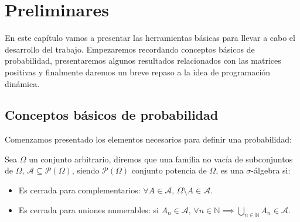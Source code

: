 \chapter{Preliminares}

En este capítulo vamos a presentar las herramientas básicas para llevar a cabo el desarrollo del trabajo. Empezaremos recordando conceptos básicos de probabilidad, presentaremos algunos resultados relacionados con las matrices positivas y finalmente daremos un breve repaso a la idea de programación dinámica.

\section{Conceptos básicos de probabilidad}
Comenzamos presentado los elementos necesarios para definir una probabilidad:
\begin{definition}
    Sea $\Omega$ un conjunto arbitrario, diremos que una familia no vacía de subconjuntos de $\Omega$, $\mathcal{A}\subseteq\mathcal{P}(\Omega)$, siendo $\mathcal{P}(\Omega)$ conjunto potencia de $\Omega$, es una $\sigma$-álgebra si:
    \begin{itemize}
        \item Es cerrada para complementarios: $\forall A\in\mathcal{A},\, \Omega\setminus A\in\mathcal{A}.$
        \item Es cerrada para uniones numerables: si $A_{n}\in\mathcal{A}, \,\forall n\in\mathbb{N}  \implies \displaystyle\bigcup_{n\in\mathbb{N}}A_n\in\mathcal{A}.$
    \end{itemize}
\end{definition}

